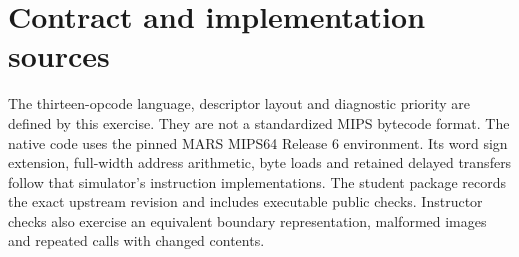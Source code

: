 \section*{Contract and implementation sources}
The thirteen-opcode language, descriptor layout and diagnostic priority are defined
by this exercise. They are not a standardized MIPS bytecode format. The native code
uses the pinned MARS MIPS64 Release 6 environment. Its word sign extension, full-width
address arithmetic, byte loads and retained delayed transfers follow that simulator's
instruction implementations. The student package records the exact upstream revision
and includes executable public checks. Instructor checks also exercise an equivalent
boundary representation, malformed images and repeated calls with changed contents.
